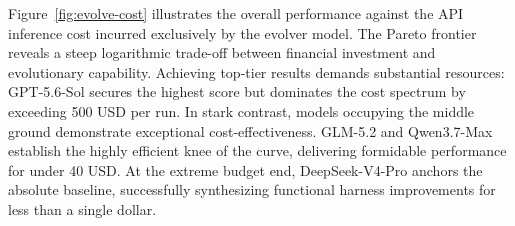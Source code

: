 

Figure~\ref{fig:evolve-cost} illustrates the overall performance against the API inference cost incurred exclusively by the evolver model. The Pareto frontier reveals a steep logarithmic trade-off between financial investment and evolutionary capability. Achieving top-tier results demands substantial resources: GPT-5.6-Sol secures the highest score but dominates the cost spectrum by exceeding 500 USD per run. In stark contrast, models occupying the middle ground demonstrate exceptional cost-effectiveness. GLM-5.2 and Qwen3.7-Max establish the highly efficient knee of the curve, delivering formidable performance for under 40 USD. At the extreme budget end, DeepSeek-V4-Pro anchors the absolute baseline, successfully synthesizing functional harness improvements for less than a single dollar.


